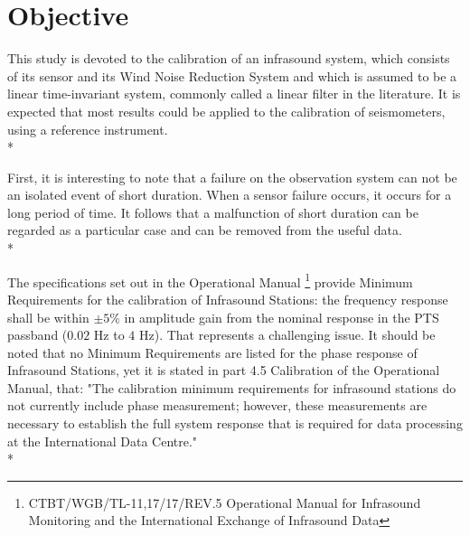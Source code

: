 \section{Objective}


This study is devoted to the calibration of an infrasound system, which consists of its sensor and its Wind Noise Reduction System and which is assumed to be a linear time-invariant system, commonly called a linear filter in the literature.  It is expected that most results could be applied to the calibration of seismometers, using a reference instrument.\\*

First, it is interesting to note that a failure on the observation system can not be an isolated event of short duration. When a sensor failure occurs, it occurs for a long period of time. It follows that a malfunction of short duration can be regarded as a particular case and can be removed from the useful data.\\*



The specifications set out in the Operational Manual \footnote{CTBT/WGB/TL-11,17/17/REV.5 Operational Manual for Infrasound Monitoring and the International Exchange of Infrasound Data} provide Minimum Requirements for the calibration of Infrasound Stations: the frequency response shall be within $\pm 5\%$ in amplitude gain from the nominal response in the PTS passband ($0.02$ Hz to $4$ Hz). That represents a challenging issue. 
It should be noted that no Minimum Requirements are listed for the phase response of Infrasound Stations, yet it is stated in part 4.5 Calibration of the Operational Manual, that: "The calibration minimum requirements for infrasound stations do not currently include phase measurement; however, these measurements are necessary to establish the full system response that is required for data processing at the International Data Centre."\\*




